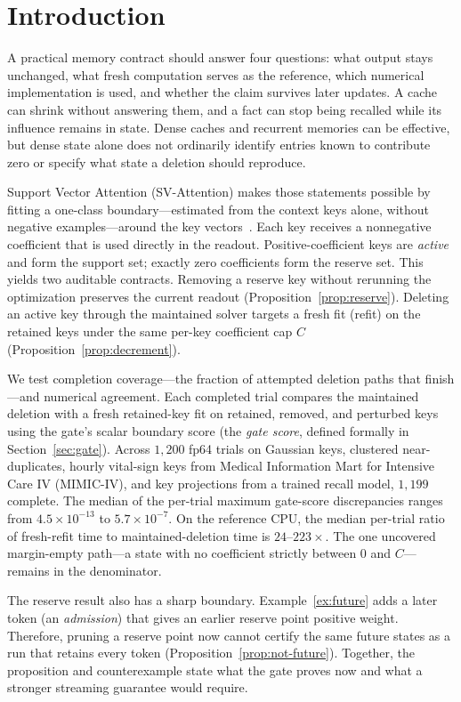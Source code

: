 \section{Introduction}

A practical memory contract should answer four questions: what output stays
unchanged, what fresh computation serves as the reference, which numerical
implementation is used, and whether the claim survives later updates. A cache
can shrink without answering them, and a fact can stop being recalled while its
influence remains in state. Dense caches and recurrent memories can be
effective, but dense state alone does not ordinarily identify entries known to
contribute zero or specify what state a deletion should reproduce.

Support Vector Attention (SV-Attention) makes those statements possible by
fitting a one-class boundary---estimated from the context keys alone, without
negative examples---around the key vectors~\citep{ocsvm,svdd}. Each
key receives a nonnegative coefficient that is used directly in the readout.
Positive-coefficient keys are \emph{active} and form the support set; exactly
zero coefficients form the reserve set. This yields two auditable contracts.
Removing a reserve key without rerunning the optimization preserves the current readout
(Proposition~\ref{prop:reserve}). Deleting an active key through the maintained
solver targets a fresh fit (refit) on the retained keys under the same per-key
coefficient cap \(C\) (Proposition~\ref{prop:decrement}).

We test completion coverage---the fraction of attempted deletion paths that
finish---and numerical agreement. Each completed trial compares
the maintained deletion with a fresh retained-key fit on retained, removed, and
perturbed keys using the gate's scalar boundary score (the \emph{gate score},
defined formally in Section~\ref{sec:gate}). Across \(1{,}200\)
fp64 trials on Gaussian keys,
clustered near-duplicates, hourly vital-sign keys from Medical
Information Mart for Intensive Care IV (MIMIC-IV), and key projections from a
trained recall model, \(1{,}199\) complete. The median of the per-trial maximum
gate-score discrepancies ranges from
\(4.5\times10^{-13}\) to
\(5.7\times10^{-7}\). On the reference CPU, the median
per-trial ratio of fresh-refit time to maintained-deletion time is
\(24\)--\(223\times\). The one uncovered margin-empty
path---a state with no coefficient strictly between \(0\) and \(C\)---remains
in the denominator.

The reserve result also has a sharp boundary. Example~\ref{ex:future} adds a
later token (an \emph{admission}) that gives an earlier reserve point positive
weight. Therefore,
pruning a reserve point now cannot certify the same future states as a run that
retains every token (Proposition~\ref{prop:not-future}). Together, the
proposition and counterexample state what the gate proves now and what a
stronger streaming guarantee would require.

